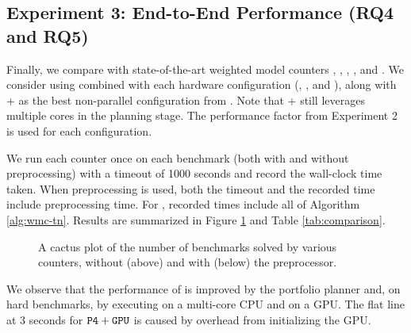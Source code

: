 \subsection{Experiment 3: End-to-End Performance (RQ4 and RQ5)}
Finally, we compare  with state-of-the-art weighted model counters , , , , and . We consider  using  combined with each hardware configuration (, , and ), along with  +  as the best non-parallel configuration from \cite{DDV19}. Note that + still leverages multiple cores in the planning stage. The performance factor from Experiment 2 is used for each  configuration.

We run each counter once on each benchmark (both with and without  preprocessing) with a timeout of 1000 seconds and record the wall-clock time taken. When preprocessing is used, both the timeout and the recorded time include preprocessing time. For , recorded times include all of Algorithm \ref{alg:wmc-tn}. Results are summarized in Figure \ref{fig:comparison} and Table \ref{tab:comparison}. 

\begin{figure}[t]
\begin{center}

%
\vspace*{-0.5cm}
\caption{\label{fig:comparison} A cactus plot of the number of benchmarks solved by various counters, without (above) and with (below) the  \cite{LM14} preprocessor.}
\end{center}
\vspace*{-0.8cm}
\end{figure}

We observe that the performance of  is improved by the portfolio planner and, on hard benchmarks, by executing on a multi-core CPU and on a GPU. The flat line at 3 seconds for $\texttt{\upshape P4}+\texttt{\upshape GPU}$ is caused by overhead from initializing the GPU.



